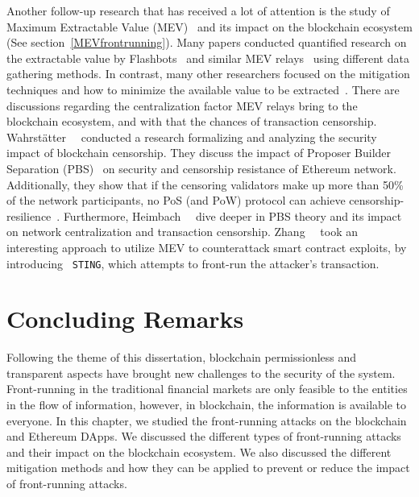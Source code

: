 Another follow-up research that has received a lot of attention is the study of Maximum Extractable Value (MEV)~\cite{flashboys} and its impact on the blockchain ecosystem (See section~\ref{MEVfrontrunning}). Many papers conducted quantified research on the extractable value by Flashbots~\cite{flashbotswebsite} and similar MEV relays~\cite{weintraub2022flash,li2023demystifying} using different data gathering methods. In contrast, many other researchers focused on the mitigation techniques and how to minimize the available value to be extracted~\cite{zhou2021a2mm,yang2022sok}. There are discussions regarding the centralization factor MEV relays bring to the blockchain ecosystem, and with that the chances of transaction censorship. Wahrstätter~\etal~\cite{wahrstatter2023blockchain} conducted a research formalizing and analyzing the security impact of blockchain censorship. They discuss the impact of Proposer Builder Separation (PBS)~\cite{ethereumPBS} on security and censorship resistance of Ethereum network. Additionally, they show that if the censoring validators make up more than 50\% of the network participants, no PoS (and PoW) protocol can achieve censorship-resilience~\cite{wahrstatter2023blockchain}. Furthermore, Heimbach~\etal~\cite{heimbach2023ethereum} dive deeper in PBS theory and its impact on network centralization and transaction censorship. Zhang~\etal~\cite{zhang2023your} took an interesting approach to utilize MEV to counterattack smart contract exploits, by introducing ~\texttt{STING}, which attempts to front-run the attacker's transaction.  




\section{Concluding Remarks} %

Following the theme of this dissertation, blockchain permissionless and transparent aspects have brought new challenges to the security of the system. Front-running in the traditional financial markets are only feasible to the entities in the flow of information, however, in blockchain, the information is available to everyone. In this chapter, we studied the front-running attacks on the blockchain and Ethereum DApps. We discussed the different types of front-running attacks and their impact on the blockchain ecosystem. We also discussed the different mitigation methods and how they can be applied to prevent or reduce the impact of front-running attacks. 

